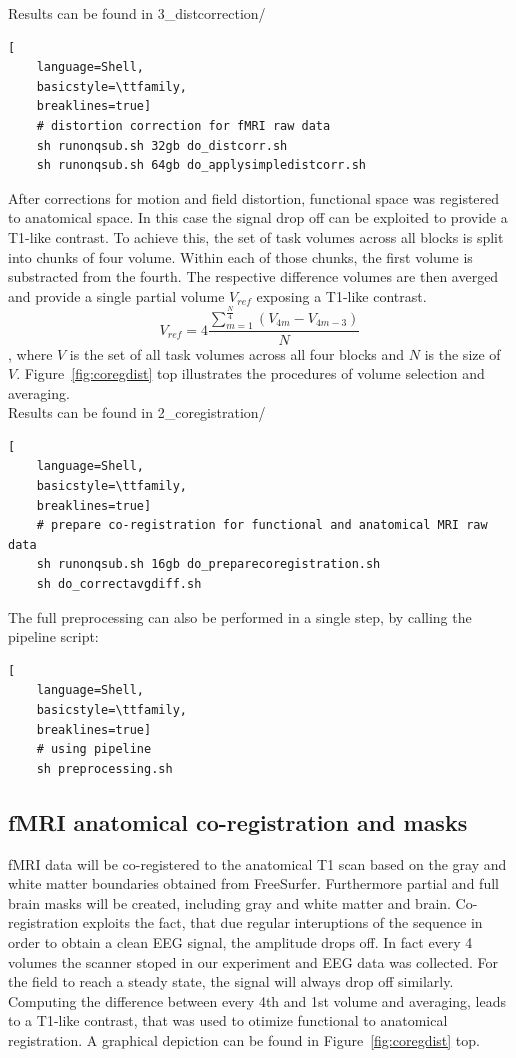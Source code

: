 \documentclass[12pt,a4paper]{scrartcl}
\begin{document}
\noindent Results can be found in 3\_distcorrection/\\
\begin{lstlisting}[
    language=Shell,
    basicstyle=\ttfamily,
    breaklines=true]
    # distortion correction for fMRI raw data
    sh runonqsub.sh 32gb do_distcorr.sh
    sh runonqsub.sh 64gb do_applysimpledistcorr.sh
\end{lstlisting}
After corrections for motion and field distortion, functional space was registered to anatomical space. In this case the signal drop off can be exploited to provide a T1-like contrast. To achieve this, the set of task volumes across all blocks is split into chunks of four volume. Within each of those chunks, the first volume is substracted from the fourth. The respective difference volumes are then averged and provide a single partial volume $V_{ref}$ exposing a T1-like contrast.
\begin{equation}
  V_{ref}=4\frac{\sum_{m=1}^{\frac{N}{4}}(V_{4m}-V_{4m-3})}{N}
\end{equation}
\noindent, where $V$ is the set of all task volumes across all four blocks and $N$ is the size of $V$. Figure~\ref{fig:coregdist} top illustrates the procedures of volume selection and averaging.\\

\noindent Results can be found in 2\_coregistration/\\
\begin{lstlisting}[
    language=Shell,
    basicstyle=\ttfamily,
    breaklines=true]
    # prepare co-registration for functional and anatomical MRI raw data
    sh runonqsub.sh 16gb do_preparecoregistration.sh
    sh do_correctavgdiff.sh
\end{lstlisting}
The full preprocessing can also be performed in a single step, by calling the pipeline script:
\begin{lstlisting}[
    language=Shell,
    basicstyle=\ttfamily,
    breaklines=true]
    # using pipeline
    sh preprocessing.sh
\end{lstlisting}

\subsection{fMRI anatomical co-registration and masks}
fMRI data will be co-registered to the anatomical T1 scan based on the gray and white matter boundaries obtained from FreeSurfer. Furthermore partial and full brain masks will be created, including gray and white matter and brain. Co-registration exploits the fact, that due regular interuptions of the sequence in order to obtain a clean EEG signal, the amplitude drops off. In fact every 4 volumes the scanner stoped in our experiment and EEG data was collected. For the field to reach a steady state, the signal will always drop off similarly.\\
\noindent Computing the difference between every 4th and 1st volume and averaging, leads to a T1-like contrast, that was used to otimize functional to anatomical registration. A graphical depiction can be found in Figure~\ref{fig:coregdist} top.\\
\end{document}
